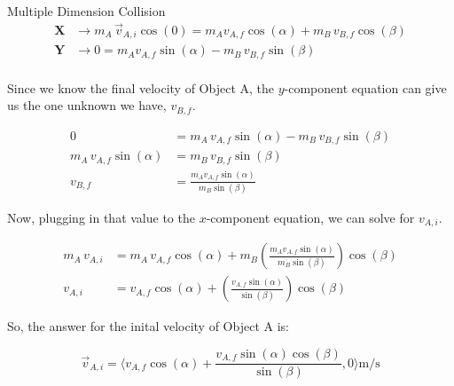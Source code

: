 \begin{example}[]{Multiple Dimension Collision}
  \begin{align*}
    \mathbf{X} &\rightarrow m_{A} \, \vec{v}_{A,i} \cos (0) = m_{A} v_{A,f} \cos (\alpha) + m_{B} \, v_{B,f} \cos (\beta) \\
    \mathbf{Y} &\rightarrow 0 = m_{A} v_{A,f} \sin (\alpha) - m_{B} \, v_{B,f} \sin (\beta) \\
  \end{align*}

  Since we know the final velocity of Object A, the $y$-component equation can give us the one unknown we have, $v_{B,f}$.

  \begin{align*}
    0 &= m_{A} \, v_{A,f} \sin (\alpha) - m_{B} \, v_{B,f} \sin (\beta) \\
    m_{A} \, v_{A,f} \sin (\alpha) &= m_{B} \, v_{B,f} \sin (\beta) \\
    v_{B,f} &= \frac{m_{A}v_{A,f} \sin (\alpha)}{m_{B} \sin (\beta)}
  \end{align*}

  Now, plugging in that value to the $x$-component equation, we can solve for $v_{A,i}$.

  \begin{align*}
    m_{A} \, v_{A,i} &= m_{A} \, v_{A,f} \cos (\alpha) + m_{B} \left( \frac{m_{A}v_{A,f} \sin (\alpha)}{m_{B} \sin (\beta)} \right) \cos (\beta) \\
    v_{A,i} &= v_{A,f} \cos (\alpha) + \left( \frac{v_{A,f} \sin (\alpha)}{\sin (\beta)} \right) \cos (\beta)
  \end{align*}

  So, the answer for the inital velocity of Object A is:

  \begin{equation*}
    \vec{v}_{A,i} = \biggl \langle v_{A,f} \cos (\alpha) + \frac{v_{A,f}\sin (\alpha) \cos (\beta)}{\sin (\beta)}, 0 \biggr \rangle \si{\meter / \second}
  \end{equation*}
\end{example}

